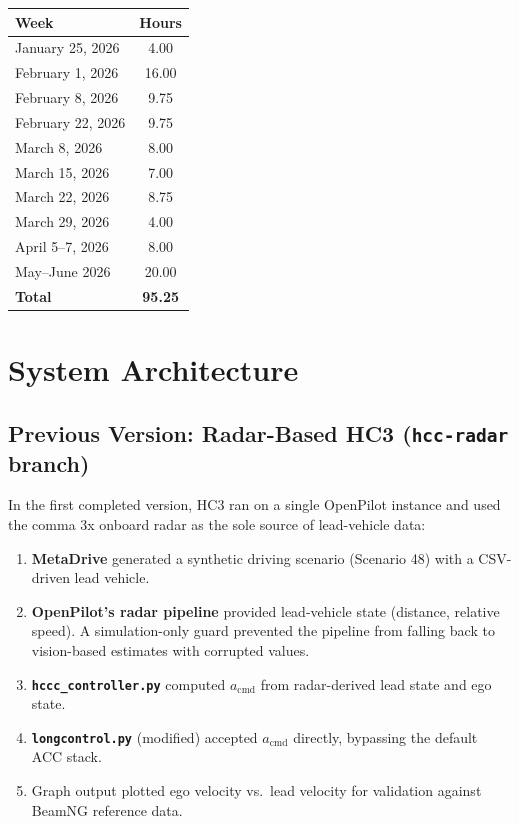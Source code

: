 \documentclass[12pt]{article}
\begin{document}
\begin{center}
\begin{tabular}{lc}
  \toprule
  \textbf{Week} & \textbf{Hours} \\
  \midrule
  January 25, 2026  & 4.00  \\
  February 1, 2026  & 16.00 \\
  February 8, 2026  & 9.75  \\
  February 22, 2026 & 9.75  \\
  March 8, 2026     & 8.00  \\
  March 15, 2026    & 7.00  \\
  March 22, 2026    & 8.75  \\
  March 29, 2026    & 4.00  \\
  April 5--7, 2026  & 8.00  \\
  May--June 2026    & 20.00 \\
  \midrule
  \textbf{Total}    & \textbf{95.25} \\
  \bottomrule
\end{tabular}
\end{center}

\section{System Architecture}

\subsection{Previous Version: Radar-Based HC3 (\texttt{hcc-radar} branch)}

In the first completed version, HC3 ran on a single OpenPilot instance and used the comma 3x onboard radar as the sole source of lead-vehicle data:

\begin{enumerate}
  \item \textbf{MetaDrive} generated a synthetic driving scenario (Scenario 48) with a CSV-driven lead vehicle.
  \item \textbf{OpenPilot's radar pipeline} provided lead-vehicle state (distance, relative speed). A simulation-only guard prevented the pipeline from falling back to vision-based estimates with corrupted values.
  \item \textbf{\texttt{hccc\_controller.py}} computed $a_{\text{cmd}}$ from radar-derived lead state and ego state.
  \item \textbf{\texttt{longcontrol.py}} (modified) accepted $a_{\text{cmd}}$ directly, bypassing the default ACC stack.
  \item Graph output plotted ego velocity vs.\ lead velocity for validation against BeamNG reference data.
\end{enumerate}
\end{document}
